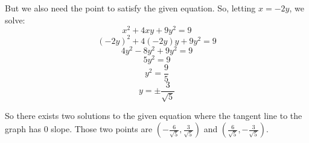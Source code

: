 \documentclass[handout,nooutcomes]{ximera}
\begin{document}
\begin{problem}
\begin{enumerate}
\begin{freeResponse}
		But we also need the point to satisfy the given equation.  So, letting $x=-2y$, we solve:
		$$x^2 + 4xy + 9y^2 = 9 $$
		$$ (-2y)^2 + 4(-2y)y + 9y^2 = 9 $$
		$$ 4y^2 - 8y^2 + 9y^2 = 9 $$
		$$ 5y^2 = 9 $$
		$$ y^2 = \frac{9}{5} $$
		$$ y = \pm \frac{3}{\sqrt{5}} $$
		
		So there exists two solutions to the given equation where the tangent line to the graph has 0 slope.  Those two points are $\left( -\frac{6}{\sqrt{5}}, \frac{3}{\sqrt{5}} \right)$ and $\left( \frac{6}{\sqrt{5}}, - \frac{3}{\sqrt{5}} \right)$.
		\end{freeResponse}
		
		
		
	\end{enumerate}
			
			
	
\end{problem}
\end{document}
